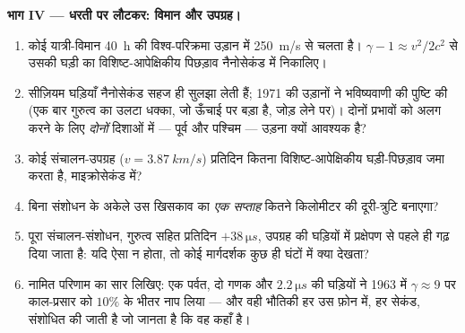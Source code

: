\begin{problem}[{सप्ताहांत समस्या --- म्युऑन, पर्वत की घड़ियाँ और
यह प्रमाण कि काल प्रसारित होता है}]
\medskip\noindent\textbf{भाग IV --- धरती पर लौटकर: विमान और
उपग्रह।}
\begin{enumerate}[resume]
  \item कोई यात्री-विमान \qty{40}{h} की विश्व-परिक्रमा उड़ान में
        \qty{250}{m/s} से चलता है। $\gamma - 1 \approx v^2/2c^2$ से
        उसकी घड़ी का विशिष्ट-आपेक्षिकीय पिछड़ाव नैनोसेकंड में
        निकालिए।
  \item सीज़ियम घड़ियाँ नैनोसेकंड सहज ही सुलझा लेती हैं; 1971 की
        उड़ानों ने भविष्यवाणी की पुष्टि की (एक बार गुरुत्व का उलटा
        धक्का, जो ऊँचाई पर बड़ा है, जोड़ लेने पर)। दोनों प्रभावों को
        अलग करने के लिए \emph{दोनों} दिशाओं में --- पूर्व और पश्चिम
        --- उड़ना क्यों आवश्यक है?
  \item कोई संचालन-उपग्रह ($v = \qty{3.87}{km/s}$) प्रतिदिन कितना
        विशिष्ट-आपेक्षिकीय घड़ी-पिछड़ाव जमा करता है, माइक्रोसेकंड में?
  \item बिना संशोधन के अकेले उस खिसकाव का \emph{एक सप्ताह} कितने
        किलोमीटर की दूरी-त्रुटि बनाएगा?
  \item पूरा संचालन-संशोधन, गुरुत्व सहित प्रतिदिन
        $+38\,\unit{\micro s}$, उपग्रह की घड़ियों में प्रक्षेपण से
        पहले ही गढ़ दिया जाता है: यदि ऐसा न होता, तो कोई
        मार्गदर्शक कुछ ही घंटों में क्या देखता?
  \item नामित परिणाम का सार लिखिए: एक पर्वत, दो गणक और
        $2.2\,\unit{\micro s}$ की घड़ियों ने 1963 में
        $\gamma \approx 9$ पर काल-प्रसार को $10\%$ के भीतर नाप
        लिया --- और वही भौतिकी हर उस फ़ोन में, हर सेकंड, संशोधित की
        जाती है जो जानता है कि वह कहाँ है।
\end{enumerate}
\end{problem}
